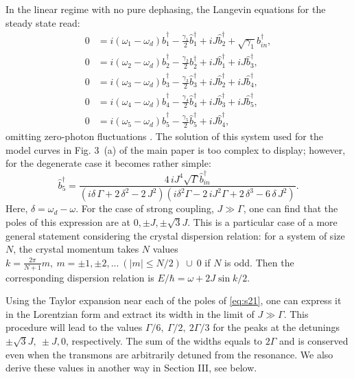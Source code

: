 \documentclass[%
 aps, pra,
 amsmath,amssymb,
 preprint,%
superscriptaddress
]{revtex4-2}
\begin{document}
In the linear regime with no pure dephasing, the Langevin equations for the steady state read:
\begin{equation}
\begin{aligned}
0 &= i(\omega_1 - \omega_d)\hat b_1^\dag - \frac{\gamma_1}{2} \hat b_1^\dag + i J\hat b_2^\dag + \sqrt{\gamma_1}b_{in}^\dag,\\
0 &= i(\omega_2 - \omega_d)\hat b_2^\dag - \frac{\gamma_2}{2} b_{2}^\dag + i J\hat b_{1}^\dag + i J\hat b_{3}^\dag,\\
0 &= i(\omega_3 - \omega_d)\hat b_3^\dag - \frac{\gamma_3}{2} \hat b_{3}^\dag + i J\hat b_{2}^\dag + i J\hat b_{4}^\dag,\\
0 &= i(\omega_4 - \omega_d)\hat b_4^\dag -\frac{\gamma_4}{2} \hat b_{4}^\dag + i J\hat b_{3}^\dag + i J\hat b_{5}^\dag,\\
0 &= i(\omega_5 - \omega_d)\hat b_5^\dag - \frac{\gamma_5}{2} \hat b_5^\dag + i J\hat b_4^\dag,
\end{aligned} 
\end{equation}
omitting zero-photon fluctuations \cite{collett1984squeezing}. The solution of this system used for the model curves in Fig. 3~(a) of the main paper is too complex to display; however, for the degenerate case it becomes rather simple:
\begin{equation}
\hat b_{{5}}^\dag={\frac {4\,i{J}^{4}\sqrt {\Gamma} \hat b_{in}^\dag}{ \left( i\delta\,
		\Gamma+2\,{\delta}^{2}-2\,{J}^{2} \right)  \left( i{\delta}^{2}
		\Gamma-2\,i{J}^{2}\Gamma+2\,{\delta}^{3}-6\,\delta\,{J}^{2
		} \right) }}.\label{eq:s21}
\end{equation}
Here, $\delta = \omega_d - \omega$. For the case of strong coupling, $J\gg \Gamma$, one can find that the poles of this expression are at $0, \pm J, \pm \sqrt 3 J $. This is a particular case of a more general statement considering the crystal dispersion relation: for a system of size $N$, the crystal momentum takes $N$ values $k = \frac{2 \pi}{N+1} m,\ m=\pm 1, \pm 2,...\ (|m| \leq N/2)\  \cup\ {0}$ if $ N $ is odd. Then the corresponding dispersion relation is $E/\hbar = \omega + 2 J \sin k/2$.

Using the Taylor expansion near each of the poles of \eqref{eq:s21}, one can express it in the Lorentzian form and extract its width in the limit of $J \gg \Gamma$. This procedure will lead to the values $\Gamma/6,\ \Gamma/2,\ 2\Gamma/3$ for the peaks at the detunings $\pm \sqrt{3}J,\ \pm J, 0$, respectively. The sum of the widths equals to $2\Gamma$ and is conserved even when the transmons are arbitrarily detuned from the resonance. We also derive these values in another way in Section III, see below.
\end{document}
